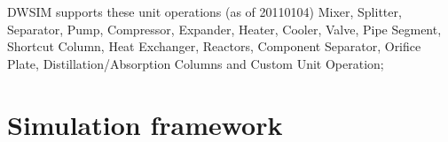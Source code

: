 DWSIM supports these unit operations (as of 20110104)
Mixer, Splitter, Separator, Pump, Compressor, Expander, Heater, Cooler, Valve, Pipe Segment, Shortcut Column, Heat Exchanger, Reactors, Component Separator, Orifice Plate, Distillation/Absorption Columns and Custom Unit Operation;


\section{Simulation framework}

